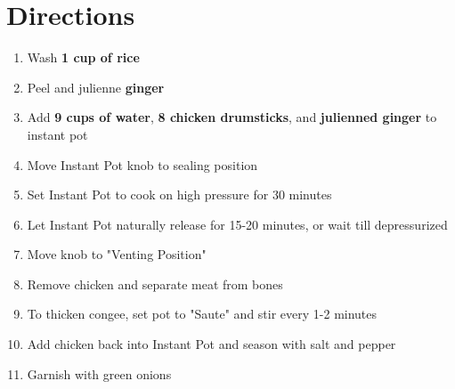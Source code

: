 \documentclass{article}
\begin{document}
\section{Directions}
\begin{enumerate}
    \item Wash \textbf{1 cup of rice}
    \item Peel and julienne \textbf{ginger}
    \item Add \textbf{9 cups of water}, \textbf{8 chicken drumsticks}, and \textbf{julienned ginger} to instant pot
    \item Move Instant Pot knob to sealing position
    \item Set Instant Pot to cook on high pressure for 30 minutes
    \item Let Instant Pot naturally release for 15-20 minutes, or wait till depressurized
    \item Move knob to "Venting Position"
    \item Remove chicken and separate meat from bones
    \item To thicken congee, set pot to "Saute" and stir every 1-2 minutes
    \item Add chicken back into Instant Pot and season with salt and pepper
    \item Garnish with green onions
\end{enumerate}
\end{document}

